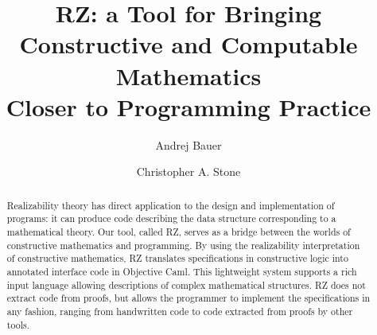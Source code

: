 \documentclass{llncs}
\newif\iflong
\begin{document}
\title{RZ: a Tool for Bringing\\
  Constructive and Computable Mathematics\\
  Closer to Programming Practice}
\author{
  Andrej Bauer \and
  Christopher A. Stone}

\maketitle

\begin{abstract}
  Realizability theory 
\iflong 
  is not only a fundamental tool in logic
  and computability, but also 
\fi %
  has direct application to the design and
  implementation of programs: it can produce code describing the data
  structure corresponding to a
  mathematical theory.
%
  Our tool, called RZ,
  serves as a bridge between the worlds of constructive
  mathematics and programming. By using the realizability
  interpretation of constructive mathematics, RZ 
  translates specifications in constructive logic into annotated
  interface code in Objective Caml.
%
  This lightweight system supports
  a rich input language allowing descriptions of
  complex mathematical structures. RZ does not extract code from
  proofs, but allows the programmer to implement the specifications in
  any fashion, ranging from handwritten code to code extracted from
  proofs by other tools.
\end{abstract}











{

}

\iflong
\appendix

\fi %
\end{document}
